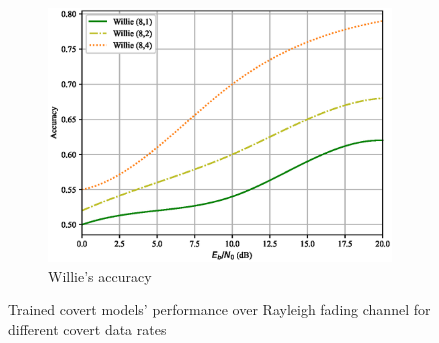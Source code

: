\begin{figure}[th!]
\begin{subfigure}{0.3\textwidth}
		\includegraphics[width=\linewidth]{figs/willie_accuracy_rayleigh}
		\caption{Willie's accuracy}
		\label{fig:rayleigh_resutls_willie}
	\end{subfigure}
	\caption{Trained covert models' performance over Rayleigh fading channel for different covert data rates}
	\label{fig:rayleigh_resutls}
\end{figure}
